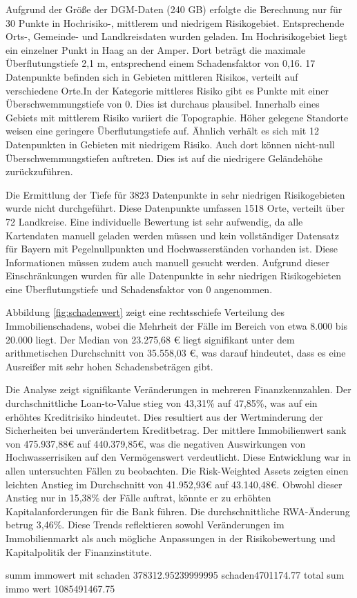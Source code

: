 Aufgrund der Größe der \ac{DGM}-Daten (240 GB) erfolgte die Berechnung nur für 30 Punkte in Hochrisiko-, mittlerem und niedrigem Risikogebiet. Entsprechende Orts-, Gemeinde- und Landkreisdaten wurden geladen.
Im Hochrisikogebiet liegt ein einzelner Punkt in Haag an der Amper. Dort beträgt die maximale Überflutungstiefe 2,1 m, entsprechend einem Schadensfaktor von 0,16.
17 Datenpunkte befinden sich in Gebieten mittleren Risikos, verteilt auf verschiedene Orte.In der Kategorie mittleres Risiko gibt es Punkte mit einer Überschwemmungstiefe von 0. Dies ist durchaus plausibel. Innerhalb eines Gebiets mit mittlerem Risiko variiert die Topographie. Höher gelegene Standorte weisen eine geringere Überflutungstiefe auf. Ähnlich verhält es sich mit 12 Datenpunkten in Gebieten mit niedrigem Risiko. Auch dort können nicht-null Überschwemmungstiefen auftreten. Dies ist auf die niedrigere Geländehöhe zurückzuführen. 

Die Ermittlung der Tiefe für 3823 Datenpunkte in sehr niedrigen Risikogebieten wurde nicht durchgeführt. Diese Datenpunkte umfassen 1518 Orte, verteilt über 72 Landkreise. Eine individuelle Bewertung ist sehr aufwendig, da alle Kartendaten manuell geladen werden müssen und kein vollständiger Datensatz für Bayern mit Pegelnullpunkten und Hochwasserständen vorhanden ist. Diese Informationen müssen zudem auch manuell gesucht werden. Aufgrund dieser Einschränkungen wurden für alle Datenpunkte in sehr niedrigen Risikogebieten eine Überflutungstiefe und Schadensfaktor von 0 angenommen.

Abbildung \ref{fig:schadenwert} zeigt eine rechtsschiefe Verteilung des Immobilienschadens, wobei die Mehrheit der Fälle im Bereich von etwa 8.000 bis 20.000 liegt. Der Median von 23.275,68 € liegt signifikant unter dem arithmetischen Durchschnitt von 35.558,03 €, was darauf hindeutet, dass es eine Ausreißer mit sehr hohen Schadensbeträgen gibt.

Die Analyse zeigt signifikante Veränderungen in mehreren Finanzkennzahlen. Der durchschnittliche Loan-to-Value stieg von 43,31\% auf 47,85\%, was auf ein erhöhtes Kreditrisiko hindeutet. Dies resultiert aus der Wertminderung der Sicherheiten bei unverändertem Kreditbetrag. Der mittlere Immobilienwert sank von 475.937,88€ auf 440.379,85€, was die negativen Auswirkungen von Hochwasserrisiken auf den Vermögenswert verdeutlicht. Diese Entwicklung war in allen untersuchten Fällen zu beobachten. Die Risk-Weighted Assets zeigten einen leichten Anstieg im Durchschnitt von 41.952,93€ auf 43.140,48€. Obwohl dieser Anstieg nur in 15,38\% der Fälle auftrat, könnte er zu erhöhten Kapitalanforderungen für die Bank führen. Die durchschnittliche RWA-Änderung betrug 3,46\%. Diese Trends reflektieren sowohl Veränderungen im Immobilienmarkt als auch mögliche Anpassungen in der Risikobewertung und Kapitalpolitik der Finanzinstitute.

summ immowert mit schaden 378312.95239999995
schaden4701174.77
total sum immo wert 1085491467.75
